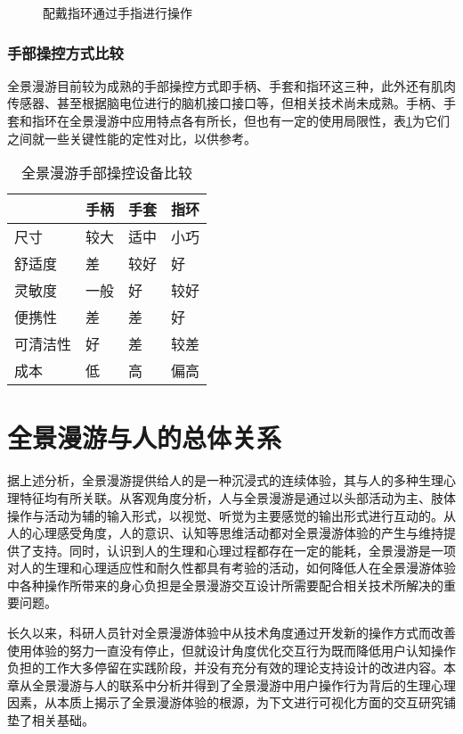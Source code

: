 \begin{figure}[htp]
\centering
{}
\caption{配戴指环通过手指进行操作}
\label{fig:ring}
\end{figure}

\subsubsection{手部操控方式比较}
全景漫游目前较为成熟的手部操控方式即手柄、手套和指环这三种，此外还有肌肉传感器、甚至根据脑电位进行的脑机接口接口等，但相关技术尚未成熟。手柄、手套和指环在全景漫游中应用特点各有所长，但也有一定的使用局限性，表\ref{tab:hand}为它们之间就一些关键性能的定性对比，以供参考。

\begin{table}[htbp]
\centering
\caption{全景漫游手部操控设备比较}
\vskip 5pt
\begin{tabular}{llll}
\toprule
 & 手柄 & 手套 & 指环 \\
\midrule
尺寸 & 较大 & 适中 & 小巧 \\
舒适度 & 差 & 较好 & 好 \\
灵敏度 & 一般 & 好 & 较好 \\
便携性 & 差 & 差 & 好 \\
可清洁性 & 好 & 差 & 较差 \\
成本 & 低 & 高 & 偏高 \\
\bottomrule
\end{tabular}
\label{tab:hand}
\vskip 15pt
\end{table}


\section{全景漫游与人的总体关系}
据上述分析，全景漫游提供给人的是一种沉浸式的连续体验，其与人的多种生理心理特征均有所关联。从客观角度分析，人与全景漫游是通过以头部活动为主、肢体操作与活动为辅的输入形式，以视觉、听觉为主要感觉的输出形式进行互动的。从人的心理感受角度，人的意识、认知等思维活动都对全景漫游体验的产生与维持提供了支持。同时，认识到人的生理和心理过程都存在一定的能耗，全景漫游是一项对人的生理和心理适应性和耐久性都具有考验的活动，如何降低人在全景漫游体验中各种操作所带来的身心负担是全景漫游交互设计所需要配合相关技术所解决的重要问题。

长久以来，科研人员针对全景漫游体验中从技术角度通过开发新的操作方式而改善使用体验的努力一直没有停止，但就设计角度优化交互行为既而降低用户认知操作负担的工作大多停留在实践阶段，并没有充分有效的理论支持设计的改进内容。本章从全景漫游与人的联系中分析并得到了全景漫游中用户操作行为背后的生理心理因素，从本质上揭示了全景漫游体验的根源，为下文进行可视化方面的交互研究铺垫了相关基础。
